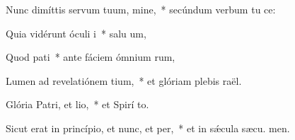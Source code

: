 \item Nunc dimíttis servum tuum, mine,~* secúndum verbum tu  ce:
\item Quia vidérunt óculi i~* salu um,
\item Quod pati~* ante fáciem ómnium rum,
\item Lumen ad revelatiónem tium,~* et glóriam plebis  raël.
\item Glória Patri, et lio,~* et Spirí to.
\item Sicut erat in princípio, et nunc, et per,~* et in sǽcula sæcu. men.
